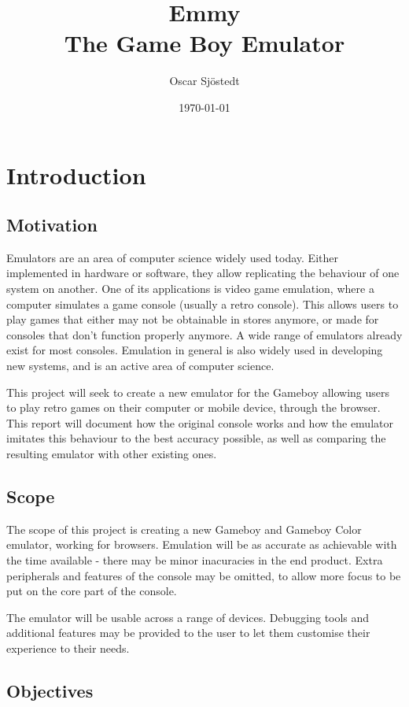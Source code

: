 \documentclass[11pt]{informatics-report}
\title{Emmy \\\vspace{0.2cm}The Game Boy Emulator}
\author{Oscar Sjöstedt}
\date{\today}
\begin{document}
\createFrontMatter

\onehalfspacing

{\hypersetup{hidelinks}\tableofcontents}

\doublespacing

\chapter{Introduction}

\section{Motivation}

Emulators are an area of computer science widely used today. Either implemented in hardware or software, they allow replicating the behaviour of one system on another. One of its applications is video game emulation, where a computer simulates a game console (usually a retro console). This allows users to play games that either may not be obtainable in stores anymore, or made for consoles that don't function properly anymore. A wide range of emulators already exist for most consoles. Emulation in general is also widely used in developing new systems, and is an active area of computer science.

This project will seek to create a new emulator for the Gameboy allowing users to play retro games on their computer or mobile device, through the browser. This report will document how the original console works and how the emulator imitates this behaviour to the best accuracy possible, as well as comparing the resulting emulator with other existing ones.

\section{Scope}

The scope of this project is creating a new Gameboy and Gameboy Color emulator, working for browsers. Emulation will be as accurate as achievable with the time available - there may be minor inacuracies in the end product. Extra peripherals and features of the console may be omitted, to allow more focus to be put on the core part of the console.

The emulator will be usable across a range of devices. Debugging tools and additional features may be provided to the user to let them customise their experience to their needs.

\section{Objectives}
\end{document}
